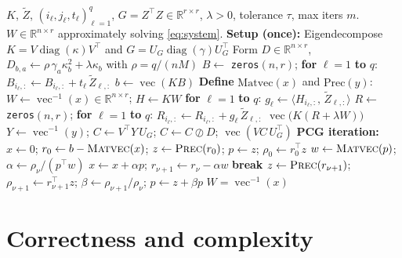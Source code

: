 \documentclass[12pt]{article}
\DeclareMathOperator{\vecop}{vec}
\DeclareMathOperator{\diag}{diag}
\newcommand{\bR}{\mathbb{R}}
\theoremstyle{remark}
\begin{document}
\begin{algorithm}[H]
\caption{PCG solver for the mode-$k$ subproblem \eqref{eq:system}}
\label{alg:pcg}
\begin{algorithmic}[1]
  \Require $K$, $\tilde Z$, $(i_\ell,j_\ell,t_\ell)_{\ell=1}^q$, $G=Z^{\!\top}Z\in\bR^{r\times r}$, $\lambda>0$, tolerance $\tau$, max iters $m$.
  \Ensure $W\in\bR^{n\times r}$ approximately solving \eqref{eq:system}.
  \Statex \textbf{Setup (once):}
  \State Eigendecompose $K = V\diag(\kappa)V^{\!\top}$ and $G = U_G\diag(\gamma)U_G^{\!\top}$
  \State Form $D\in\bR^{n\times r}$, $D_{b,a}\gets \rho\,\gamma_a\kappa_b^2+\lambda\kappa_b$ with $\rho=q/(nM)$ 
  \State $B \gets$ \texttt{zeros}$(n,r)$; \textbf{for} $\ell=1$ \textbf{to} $q$: $B_{i_\ell,:}\gets B_{i_\ell,:}+t_\ell\,\tilde Z_{\ell,:}$ 
  \State $b \gets \vecop(KB)$
  \Statex \textbf{Define} $\mathrm{Matvec}(x)$ and $\mathrm{Prec}(y)$:
   
    \State $W \gets \vecop^{-1}(x)\in\bR^{n\times r}$; \; $H \gets K W$
    \State \textbf{for} $\ell=1$ \textbf{to} $q$: $g_\ell \gets \langle H_{i_\ell,:},\,\tilde Z_{\ell,:}\rangle$
    \State $R\gets$\texttt{zeros}$(n,r)$; \textbf{for} $\ell=1$ \textbf{to} $q$: $R_{i_\ell,:}\gets R_{i_\ell,:}+g_\ell\,\tilde Z_{\ell,:}$
    \State \Return $\vecop\big(K(R+\lambda W)\big)$
  \EndFunction
   
    \State $Y\gets\vecop^{-1}(y)$; \; $C\gets V^{\!\top}Y\,U_G$; \; $C\gets C\oslash D$; \; \Return $\vecop(V C\, U_G^{\!\top})$
  \EndFunction
  \Statex \textbf{PCG iteration:}
  \State $x\gets 0$; \; $r_0 \gets b - \textsc{Matvec}(x)$; \; $z\gets\textsc{Prec}(r_0)$; \; $p\gets z$; \; $\rho_0\gets r_0^{\!\top}z$
    \State $w \gets \textsc{Matvec}(p)$; \; $\alpha \gets \rho_\nu / (p^{\!\top}w)$
    \State $x \gets x + \alpha p$; \; $r_{\nu+1} \gets r_\nu - \alpha w$
     \textbf{break} \EndIf
    \State $z \gets \textsc{Prec}(r_{\nu+1})$; \; $\rho_{\nu+1}\gets r_{\nu+1}^{\!\top}z$; \; $\beta \gets \rho_{\nu+1}/\rho_\nu$; \; $p \gets z + \beta p$
  \EndFor
  \State \Return $W = \vecop^{-1}(x)$
\end{algorithmic}
\end{algorithm}

\section{Correctness and complexity}
\end{document}
